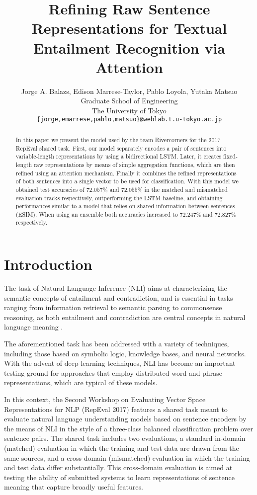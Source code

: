\documentclass[11pt,letterpaper]{article}
\title{Refining Raw Sentence Representations for Textual Entailment Recognition via Attention}
\author{Jorge A. Balazs, Edison Marrese-Taylor, Pablo Loyola, Yutaka Matsuo \\
  Graduate School of Engineering\\
  The University of Tokyo\\
  {\tt \{jorge,emarrese,pablo,matsuo\}@weblab.t.u-tokyo.ac.jp} \\}
\date{}
\begin{document}
\maketitle
\begin{abstract}
    In this paper we present the model used by the team Rivercorners for the 2017 RepEval shared task. First, our model separately encodes a pair of sentences into variable-length representations by using a bidirectional LSTM. Later, it creates fixed-length raw representations by means of simple aggregation functions, which are then refined using an attention mechanism. Finally it combines the refined representations of both sentences into a single vector to be used for classification. With this model we obtained test accuracies of $72.057\%$ and $72.055\%$ in the matched and mismatched evaluation tracks respectively, outperforming the LSTM baseline, and obtaining performances similar to a model that relies on shared information between sentences (ESIM). When using an ensemble both accuracies increased to $72.247\%$ and $72.827\%$ respectively.

\end{abstract}


\section{Introduction}


The task of Natural Language Inference (NLI)
aims at characterizing the semantic concepts of entailment and contradiction, and is essential in tasks ranging from information retrieval to semantic parsing to commonsense reasoning, as both entailment and contradiction are central concepts in natural language meaning \cite{katz1972semantic, van2008brief}.

The aforementioned task has been addressed with a variety of techniques, including those based on symbolic logic, knowledge bases, and neural networks. With the advent of deep learning techniques, NLI has become an important testing ground for approaches that employ distributed word and phrase representations, which are typical of these models.

In this context, the Second Workshop on Evaluating Vector Space Representations for NLP (RepEval 2017) features a shared task meant to evaluate natural language understanding models based on sentence encoders by the means of NLI in the style of a three-class balanced classification problem over sentence pairs. The shared task includes two evaluations, a standard in-domain (matched) evaluation in which the training and test data are drawn from the same sources, and a cross-domain (mismatched) evaluation in which the training and test data differ substantially. This cross-domain evaluation is aimed at testing the ability of submitted systems to learn representations of sentence meaning that capture broadly useful features.
\end{document}
